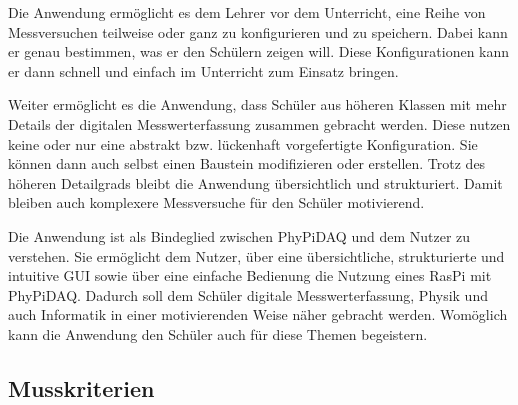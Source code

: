 \documentclass[parskip=full]{scrartcl}
\begin{document}
Die Anwendung ermöglicht es dem Lehrer vor dem Unterricht, eine Reihe von Messversuchen teilweise oder ganz zu konfigurieren und zu speichern. Dabei kann er genau bestimmen, was er den Schülern zeigen will. Diese Konfigurationen kann er dann schnell und einfach im Unterricht zum Einsatz bringen. 

Weiter ermöglicht es die Anwendung, dass Schüler aus höheren Klassen mit mehr Details der digitalen Messwerterfassung zusammen gebracht werden. Diese nutzen keine oder nur eine abstrakt bzw. lückenhaft vorgefertigte Konfiguration. Sie können dann auch selbst einen Baustein modifizieren oder erstellen. Trotz des höheren Detailgrads bleibt die Anwendung übersichtlich und strukturiert. Damit bleiben auch komplexere Messversuche für den Schüler motivierend. 

Die Anwendung ist als Bindeglied zwischen \gls{PhyPiDAQ} und dem Nutzer zu verstehen. Sie ermöglicht dem Nutzer, über eine übersichtliche, strukturierte und intuitive GUI sowie über eine einfache Bedienung die Nutzung eines \gls{RasPi} mit \gls{PhyPiDAQ}. Dadurch soll dem Schüler digitale Messwerterfassung, Physik und auch Informatik in einer motivierenden Weise näher gebracht werden. Womöglich kann die Anwendung den Schüler auch für diese Themen begeistern.  

\subsection{Musskriterien}
\end{document}
